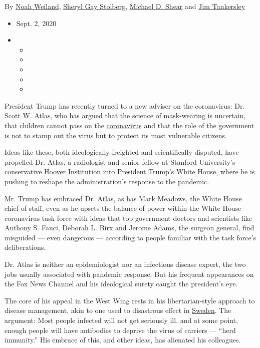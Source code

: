 By \href{https://www.nytimes3xbfgragh.onion/by/noah-weiland}{Noah
Weiland},
\href{https://www.nytimes3xbfgragh.onion/by/sheryl-gay-stolberg}{Sheryl
Gay Stolberg},
\href{https://www.nytimes3xbfgragh.onion/by/michael-d-shear}{Michael D.
Shear} and
\href{https://www.nytimes3xbfgragh.onion/by/jim-tankersley}{Jim
Tankersley}

\begin{itemize}
\item
  Sept. 2, 2020
\item
  \begin{itemize}
  \item
  \item
  \item
  \item
  \item
  \end{itemize}
\end{itemize}

President Trump has recently turned to a new adviser on the coronavirus:
Dr. Scott W. Atlas, who has argued that the science of mask-wearing is
uncertain, that children cannot pass on the
\href{https://www.nytimes3xbfgragh.onion/2020/09/02/world/covid-19-coronavirus.html}{coronavirus}
and that the role of the government is not to stamp out the virus but to
protect its most vulnerable citizens.

Ideas like these, both ideologically freighted and scientifically
disputed, have propelled Dr. Atlas, a radiologist and senior fellow at
Stanford University's conservative \href{https://www.hoover.org/}{Hoover
Institution} into President Trump's White House, where he is pushing to
reshape the administration's response to the pandemic.

Mr. Trump has embraced Dr. Atlas, as has Mark Meadows, the White House
chief of staff, even as he upsets the balance of power within the White
House coronavirus task force with ideas that top government doctors and
scientists like Anthony S. Fauci, Deborah L. Birx and Jerome Adams, the
surgeon general, find misguided --- even dangerous --- according to
people familiar with the task force's deliberations.

Dr. Atlas is neither an epidemiologist nor an infectious disease expert,
the two jobs usually associated with pandemic response. But his frequent
appearances on the Fox News Channel and his ideological surety caught
the president's eye.

The core of his appeal in the West Wing rests in his libertarian-style
approach to disease management, akin to one used to disastrous effect in
\href{https://www.nytimes3xbfgragh.onion/2020/07/07/business/sweden-economy-coronavirus.html}{Sweden}.
The argument: Most people infected will not get seriously ill, and at
some point, enough people will have antibodies to deprive the virus of
carriers --- ``herd immunity.'' His embrace of this, and other ideas,
has alienated his colleagues.


